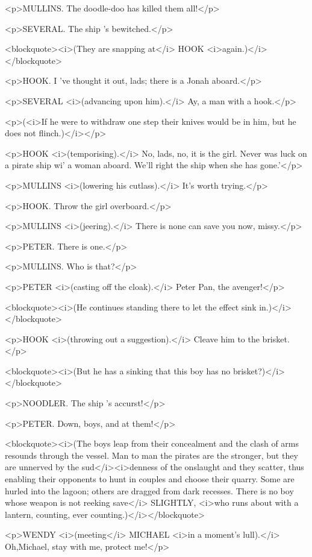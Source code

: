 <p>MULLINS. The doodle-doo has killed them all!</p>

<p>SEVERAL. The ship 's bewitched.</p>

<blockquote><i>(They are snapping at</i> HOOK <i>again.)</i></blockquote>

<p>HOOK. I 've thought it out, lads; there is a Jonah aboard.</p>

<p>SEVERAL <i>(advancing upon him).</i> Ay, a man with a hook.</p>

<p>(<i>If he were to withdraw one step their knives would be in him, but he does not flinch.)</i></p>

<p>HOOK <i>(temporising).</i> No, lads, no, it is the girl. Never was luck on a pirate ship wi' a woman aboard. We'll right the ship when she has gone.'</p>

<p>MULLINS <i>(lowering his cutlass).</i> It's worth trying.</p>

<p>HOOK. Throw the girl overboard.</p>

<p>MULLINS <i>(jeering).</i> There is none can save you now, missy.</p>

<p>PETER. There is one.</p>

<p>MULLINS. Who is that?</p>

<p>PETER <i>(casting off the cloak).</i> Peter Pan, the avenger!</p>

<blockquote><i>(He continues standing there to let the effect sink in.)</i></blockquote>

<p>HOOK <i>(throwing out a suggestion).</i> Cleave him to the brisket.</p>

<blockquote><i>(But he has a sinking that this boy has no brisket?)</i></blockquote>

<p>NOODLER. The ship 's accurst!</p>

<p>PETER. Down, boys, and at them!</p>

<blockquote><i>(The boys leap from their concealment and the clash of arms resounds through the vessel. Man to man the pirates are the stronger, but they are unnerved by the sud</i><i>denness of the onslaught and they scatter, thus enabling their opponents to hunt in couples and choose their quarry. Some are hurled into the lagoon; others are dragged from dark recesses. There is no boy whose weapon is not reeking save</i> SLIGHTLY, <i>who runs about with a lantern, counting, ever counting.)</i></blockquote>

<p>WENDY <i>(meeting</i> MICHAEL <i>in a moment's lull).</i> Oh,Michael, stay with me, protect me!</p>

